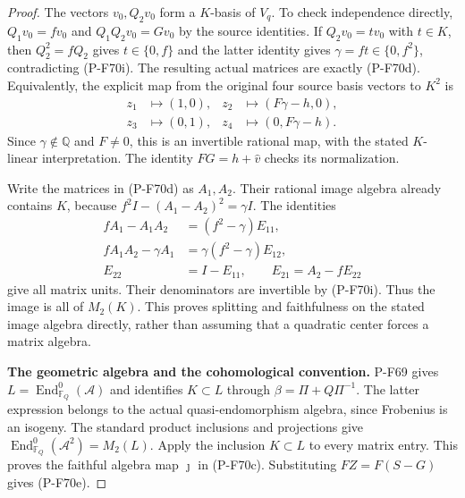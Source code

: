 \begin{proof}
The vectors $v_0,Q_2v_0$ form a $K$-basis of $V_q$.
To check independence directly, $Q_1v_0=fv_0$ and
$Q_1Q_2v_0=Gv_0$ by the source identities.  If
$Q_2v_0=t v_0$ with $t\in K$, then $Q_2^2=fQ_2$
gives $t\in\{0,f\}$ and the latter identity gives
$\gamma=ft\in\{0,f^2\}$, contradicting (P-F70i).
The resulting actual matrices are exactly (P-F70d).
Equivalently, the explicit map from the original four
source basis vectors to $K^2$ is
\[
 \begin{aligned}
 z_1&\longmapsto(1,0),&
 z_2&\longmapsto(F\gamma-h,0),\\
 z_3&\longmapsto(0,1),&
 z_4&\longmapsto(0,F\gamma-h).
 \end{aligned}                                                 \tag{P-F70j}
\]
Since $\gamma\notin\mathbb Q$ and $F\ne0$, this is an
invertible rational map, with the stated $K$-linear
interpretation.  The identity $FG=h+\widehat v$ checks
its normalization.

Write the matrices in (P-F70d) as $A_1,A_2$.
Their rational image algebra already contains $K$,
because $f^2I-(A_1-A_2)^2=\gamma I$.  The identities
\[
 \begin{split}
 fA_1-A_1A_2&=(f^2-\gamma)E_{11},\\
 fA_1A_2-\gamma A_1&=\gamma(f^2-\gamma)E_{12},\\
 E_{22}&=I-E_{11},\qquad E_{21}=A_2-fE_{22}
 \end{split}                                                   \tag{P-F70k}
\]
give all matrix units.  Their denominators are invertible
by (P-F70i).  Thus the image is all of $M_2(K)$.
This proves splitting and faithfulness on the stated
image algebra directly, rather than assuming that a
quadratic center forces a matrix algebra.

\par\medskip\noindent\textbf{The geometric algebra and the cohomological convention.}
P-F69 gives $L=\operatorname{End}^0_{\mathbb F_Q}(\mathcal A)$
and identifies $K\subset L$ through
$\beta=\Pi+Q\Pi^{-1}$.  The latter expression belongs to
the actual quasi-endomorphism algebra, since Frobenius
is an isogeny.  The standard product inclusions and
projections give
$\operatorname{End}^0_{\mathbb F_Q}(\mathcal A^2)=M_2(L)$.
Apply the inclusion $K\subset L$ to every matrix entry.
This proves the faithful algebra map $\jmath$ in (P-F70c).
Substituting $FZ=F(S-G)$ gives (P-F70e).


\end{proof}
